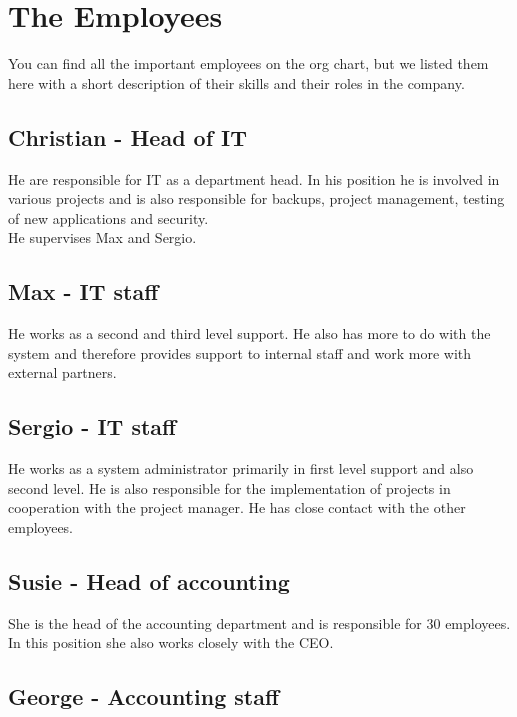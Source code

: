 \section{The Employees}

You can find all the important employees on the org chart, but we listed them here with a short description of their skills and their roles in the company.
\\

\subsection{Christian - Head of IT}

He are responsible for IT as a department head. 
In his position he is involved in various projects and is also responsible for backups, project management, testing of new applications and security.
\\

He supervises Max and Sergio.

\subsection{Max - IT staff}

He works as a second and third level support.
He also has more to do with the system and therefore provides support to internal staff and work more with external partners.

\subsection{Sergio - IT staff}

He works as a system administrator primarily in first level support and also second level. He is also responsible for the implementation of projects in cooperation with the project manager.
He has close contact with the other employees.

\subsection{Susie - Head of accounting}

She is the head of the accounting department and is responsible for 30 employees. 
In this position she also works closely with the CEO.

\subsection{George - Accounting staff}

